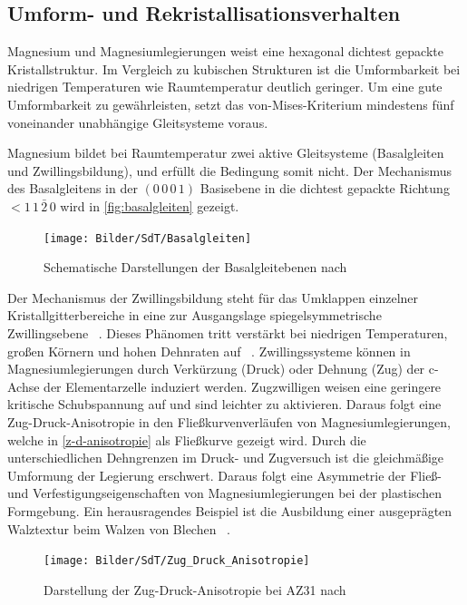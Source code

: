 \subsection{Umform- und Rekristallisationsverhalten}\label{sec:Umformverhalten}

Magnesium und Magnesiumlegierungen weist eine hexagonal dichtest gepackte Kristallstruktur.
Im Vergleich zu kubischen Strukturen ist die Umformbarkeit bei niedrigen Temperaturen wie Raumtemperatur deutlich geringer.
Um eine gute Umformbarkeit zu gewährleisten, setzt das von-Mises-Kriterium mindestens fünf voneinander unabhängige Gleitsysteme voraus. \cite{Schmidt.2011}

Magnesium bildet bei Raumtemperatur zwei aktive Gleitsysteme (Basalgleiten und Zwillingsbildung), und erfüllt die Bedingung somit nicht.
Der Mechanismus des Basalgleitens in der $(0\,0\,0\,1)$ Basisebene in die dichtest gepackte Richtung $<1\,1\,\bar{2}\,0$ wird in \autoref{fig:basalgleiten} gezeigt.

\begin{figure}[H]%
	\centering
	\texttt{[image: Bilder/SdT/Basalgleiten]}
	\caption[Basalgleitebenen]{Schematische Darstellungen der Basalgleitebenen nach \cite{Kammer.2000}}
	\label{fig:basalgleiten}
\end{figure}

Der Mechanismus der Zwillingsbildung steht für das Umklappen einzelner Kristallgitterbereiche in eine zur Ausgangslage spiegelsymmetrische Zwillingsebene \cite{Ullmann.2014}~.
Dieses Phänomen tritt verstärkt bei niedrigen Temperaturen, großen Körnern und hohen Dehnraten auf \cite{Ulacia.2011,Reh.1973}~.
Zwillingssysteme können in Magnesiumlegierungen durch Verkürzung (Druck) oder Dehnung (Zug) der c-Achse der Elementarzelle induziert werden.
Zugzwilligen weisen eine geringere kritische Schubspannung auf und sind leichter zu aktivieren.
Daraus folgt eine Zug-Druck-Anisotropie in den Fließkurvenverläufen von Magnesiumlegierungen, welche in \autoref{z-d-anisotropie} als Fließkurve gezeigt wird.
Durch die unterschiedlichen Dehngrenzen im Druck- und Zugversuch ist die gleichmäßige Umformung der Legierung erschwert.
Daraus folgt eine Asymmetrie der Fließ- und Verfestigungseigenschaften von Magnesiumlegierungen bei der plastischen Formgebung.
Ein herausragendes Beispiel ist die Ausbildung einer ausgeprägten Walztextur beim Walzen von Blechen \cite{Steglich.2014,Schmidt.2011}~.

\begin{figure}[H]%
	\centering
	\texttt{[image: Bilder/SdT/Zug\_Druck\_Anisotropie]}
	\caption[Zug-Druck-Anisotropie]{Darstellung der Zug-Druck-Anisotropie bei AZ31 nach \cite{Schmidt.2011}}
	\label{z-d-anisotropie}
\end{figure}

